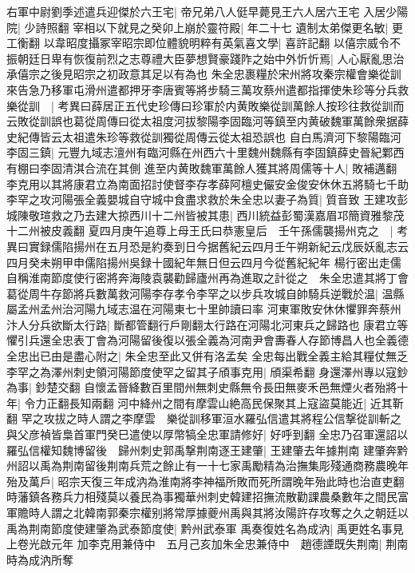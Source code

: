 右軍中尉劉季述遣兵迎傑於六王宅|{
	帝兄弟八人侹早薨見王六人居六王宅}
入居少陽院|{
	少詩照翻}
宰相以下就見之癸卯上崩於靈符殿|{
	年二十七}
遺制太弟傑更名敏|{
	更工衡翻}
以韋昭度攝冢宰昭宗即位體貌明粹有英氣喜文學|{
	喜許記翻}
以僖宗威令不振朝廷日卑有恢復前烈之志尊禮大臣夢想賢豪踐阼之始中外忻忻焉|{
	人心厭亂思治承僖宗之後見昭宗之初政意其足以有為也}
朱全忠裹糧於宋州將攻秦宗權會樂從訓來告急乃移軍屯滑州遣都押牙李唐賓等將步騎三萬攻蔡州遣都指揮使朱珍等分兵救樂從訓　|{
	考異曰薛居正五代史珍傳曰珍軍於内黄敗樂從訓萬餘人按珍往救從訓而云敗從訓誤也葛從周傳曰從太祖度河拔黎陽李固臨河等鎮至内黄破魏軍萬餘衆据薛史紀傳皆云太祖遣朱珍等救從訓獨從周傳云從太祖恐誤也}
自白馬濟河下黎陽臨河李固三鎮|{
	元豐九域志澶州有臨河縣在州西六十里魏州魏縣有李固鎮薛史晉紀鄴西有棚曰李固清淇合流在其側}
進至内黄敗魏軍萬餘人獲其將周儒等十人|{
	敗補邁翻}
李克用以其將康君立為南面招討使督李存孝薛阿檀史儼安金俊安休休五將騎七千助李罕之攻河陽張全義嬰城自守城中食盡求救於朱全忠以妻子為質|{
	質音致}
王建攻彭城陳敬瑄救之乃去建大掠西川十二州皆被其患|{
	西川統益彭蜀漢嘉眉邛簡資雅黎茂十二州被皮義翻}
夏四月庚午追尊上母王氏曰恭憲皇后　壬午孫儒襲揚州克之　|{
	考異曰實録儒陷揚州在五月恐是約奏到日今据舊紀云四月壬午朔新紀云戊辰妖亂志云四月癸未朔甲申儒陷揚州吳録十國紀年無日但云四月今從舊紀紀年}
楊行密出走儒自稱淮南節度使行密將奔海陵袁襲勸歸廬州再為進取之計從之　朱全忠遣其將丁會葛從周牛存節將兵數萬救河陽李存孝令李罕之以步兵攻城自帥騎兵逆戰於温|{
	温縣屬孟州孟州治河陽九域志温在河陽東七十里帥讀曰率}
河東軍敗安休休懼罪奔蔡州汴人分兵欲斷太行路|{
	斷都管翻行戶剛翻太行路在河陽北河東兵之歸路也}
康君立等懼引兵還全忠表丁會為河陽留後復以張全義為河南尹會夀春人存節博昌人也全義德全忠出已由是盡心附之|{
	朱全忠至此又併有洛孟矣}
全忠每出戰全義主給其糧仗無乏李罕之為澤州刺史領河陽節度使罕之留其子頎事克用|{
	頎渠希翻}
身還澤州專以寇鈔為事|{
	鈔楚交翻}
自懷孟晉絳數百里間州無刺史縣無令長田無麥禾邑無煙火者殆將十年|{
	令力正翻長知兩翻}
河中絳州之間有摩雲山絶高民保聚其上寇盜莫能近|{
	近其靳翻}
罕之攻拔之時人謂之李摩雲　樂從訓移軍洹水羅弘信遣其將程公信撃從訓斬之與父彦禎皆梟首軍門癸巳遣使以厚幣犒全忠軍請修好|{
	好呼到翻}
全忠乃召軍還詔以羅弘信權知魏博留後　歸州刺史郭禹撃荆南逐王建肇|{
	王建肇去年據荆南}
建肇奔黔州詔以禹為荆南留後荆南兵荒之餘止有一十七家禹勵精為治撫集彫殘通商務農晚年殆及萬戶|{
	昭宗天復三年成汭為淮南將李神福所敗而死所謂晚年殆此時也治直吏翻}
時藩鎮各務兵力相殘莫以養民為事獨華州刺史韓建招撫流散勸課農桑數年之間民富軍贍時人謂之北韓南郭秦宗權别將常厚據夔州禹與其將汝陽許存攻奪之久之朝廷以禹為荆南節度使建肇為武泰節度使|{
	黔州武泰軍}
禹奏復姓名為成汭|{
	禹更姓名事見上卷光啟元年}
加李克用兼侍中　五月己亥加朱全忠兼侍中　趙德諲既失荆南|{
	荆南時為成汭所奪}
